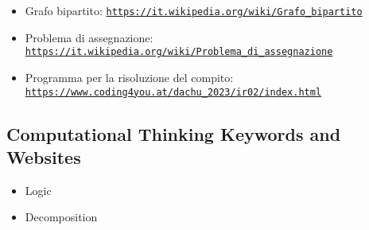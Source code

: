 \documentclass[a4paper,11pt]{report}
\newcommand{\BrochureUrlText}[1]{\texttt{#1}}
\begin{document}
\begin{itemize}
  \item Grafo bipartito: \href{https://it.wikipedia.org/wiki/Grafo_bipartito}{\BrochureUrlText{https://it.wikipedia.org/wiki/Grafo\_bipartito}}
  \item Problema di assegnazione: \href{https://it.wikipedia.org/wiki/Problema_di_assegnazione}{\BrochureUrlText{https://it.wikipedia.org/wiki/Problema\_di\_assegnazione}}
  \item Programma per la risoluzione del compito: \href{https://www.coding4you.at/dachu_2023/ir02/index.html}{\BrochureUrlText{https://www.coding4you.at/dachu\_2023/ir02/index.html}}
\end{itemize}


\subsection*{Computational Thinking Keywords and Websites}

\begin{itemize}
  \item Logic
  \item Decomposition
\end{itemize}
\end{document}
